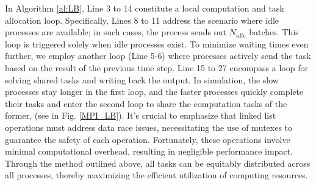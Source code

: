 In Algorithm \ref{al:LB}, Line 3 to 14 constitute a local computation and task allocation loop.
Specifically, Lines 8 to 11 address the scenario where idle processes are available; in such cases, the process sends out $N_{idle}$ batches. This loop is triggered solely when idle processes exist. To minimize waiting times even further, we employ another loop (Line 5-6) where processes actively send the task based on the result of the previous time step. Line 15 to 27 encompass a loop for solving shared tasks and writing back the output. In simulation, the slow processes stay longer in the first loop, and the faster processes quickly complete their tasks and enter the second loop to share the computation tasks of the former, (see in Fig. \ref{MPI_LB}).  %
It's crucial to emphasize that linked list operations must address data race issues, necessitating the use of mutexes to guarantee the safety of each operation. Fortunately, these operations involve minimal computational overhead, resulting in negligible performance impact.
Through the method outlined above, all tasks can be equitably distributed across all processes, thereby maximizing the efficient utilization of computing resources.

